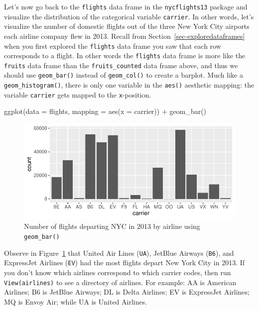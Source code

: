 \documentclass[
  letterpaper,
  DIV=11,
  numbers=noendperiod]{scrreprt}
\newenvironment{Shaded}{\begin{snugshade}}{\end{snugshade}}
\newcommand{\AttributeTok}[1]{\textcolor[rgb]{0.40,0.45,0.13}{#1}}
\newcommand{\FunctionTok}[1]{\textcolor[rgb]{0.28,0.35,0.67}{#1}}
\newcommand{\NormalTok}[1]{\textcolor[rgb]{0.00,0.23,0.31}{#1}}
\newcommand{\SpecialCharTok}[1]{\textcolor[rgb]{0.37,0.37,0.37}{#1}}
\theoremstyle{definition}
\theoremstyle{remark}
\begin{document}
Let's now go back to the \texttt{flights} data frame in the
\texttt{nycflights13} package and visualize the distribution of the
categorical variable \texttt{carrier}. In other words, let's visualize
the number of domestic flights out of the three New York City airports
each airline company flew in 2013. Recall from
Section~\ref{sec-exploredataframes} when you first explored the
\texttt{flights} data frame you saw that each row corresponds to a
flight. In other words the \texttt{flights} data frame is more like the
\texttt{fruits} data frame than the \texttt{fruits\_counted} data frame
above, and thus we should use \texttt{geom\_bar()} instead of
\texttt{geom\_col()} to create a barplot. Much like a
\texttt{geom\_histogram()}, there is only one variable in the
\texttt{aes()} aesthetic mapping: the variable \texttt{carrier} gets
mapped to the \texttt{x}-position.

\begin{Shaded}
\begin{Highlighting}[]
\FunctionTok{ggplot}\NormalTok{(}\AttributeTok{data =}\NormalTok{ flights, }\AttributeTok{mapping =} \FunctionTok{aes}\NormalTok{(}\AttributeTok{x =}\NormalTok{ carrier)) }\SpecialCharTok{+}
  \FunctionTok{geom\_bar}\NormalTok{()}
\end{Highlighting}
\end{Shaded}

\begin{figure}[H]

{\centering \includegraphics{02-visualization_files/figure-pdf/fig-flightsbar-1.pdf}

}

\caption{\label{fig-flightsbar}Number of flights departing NYC in 2013
by airline using \texttt{geom\_bar()}}

\end{figure}

Observe in Figure~\ref{fig-flightsbar} that United Air Lines
(\texttt{UA}), JetBlue Airways (\texttt{B6}), and ExpressJet Airlines
(\texttt{EV}) had the most flights depart New York City in 2013. If you
don't know which airlines correspond to which carrier codes, then run
\texttt{View(airlines)} to see a directory of airlines. For example: AA
is American Airlines; B6 is JetBlue Airways; DL is Delta Airlines; EV is
ExpressJet Airlines; MQ is Envoy Air; while UA is United Airlines.
\end{document}

